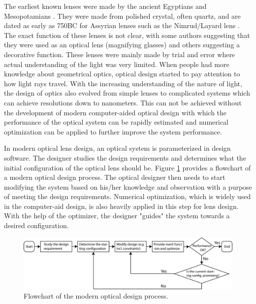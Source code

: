 The earliest known lenses were made by the ancient Egyptians and Mesopotamians \cite{wiki:HistoryofOptics}. They were made from polished crystal, often quartz, and are dated as early as 750BC for Assyrian lenses such as the Nimrud/Layard lens \cite{wiki:Nimrudlens}. The exact function of these lenses is not clear, with some authors suggesting that they were used as an optical lens (magnifying glasses) and others suggesting a decorative function. These lenses were mainly made by trial and error where actual understanding of the light was very limited. When people had more knowledge about geometrical optics, optical design started to pay attention to how light rays travel. With the increasing understanding of the nature of light, the design of optics also evolved from simple lenses to complicated systems which can achieve resolutions down to nanometers. This can not be achieved without the development of modern computer-aided optical design with which the performance of the optical system can be rapidly estimated and numerical optimization can be applied to further improve the system performance.

In modern optical lens design, an optical system is parameterized in design software. The designer studies the design requirements and determines what the initial configuration of the optical lens should be. Figure \ref{fig:chap0 model design flow} provides a flowchart of a modern optical design process. The optical designer then needs to start modifying the system based on his/her knowledge and observation with a purpose of meeting the design requirements. Numerical optimization, which is widely used in the computer-aid design, is also heavily applied in this step for lens design. With the help of the optimizer, the designer "guides" the system towards a desired configuration. 

\begin{figure}
    \centering
    \includegraphics[scale=0.58]{chapter-0/figures/lens_design_flow_chart.png}
    \caption{Flowchart of the modern optical design process.}
    \label{fig:chap0 model design flow}
\end{figure} 

